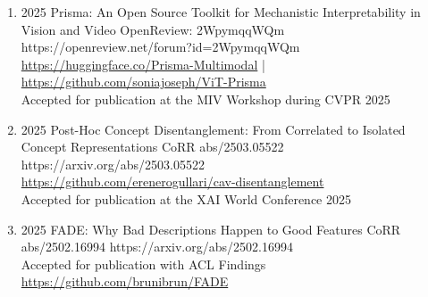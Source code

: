 {\begin{enumerate}
                        
        \item {}
                        {2025}
                        {Prisma: An Open Source Toolkit for Mechanistic Interpretability in Vision and Video}
                        {OpenReview: 2WpymqqWQm}
                        {https://openreview.net/forum?id=2WpymqqWQm}
                        {
                            \\\href{https://huggingface.co/Prisma-Multimodal}{https://huggingface.co/Prisma-Multimodal} | \href{https://github.com/soniajoseph/ViT-Prisma}{https://github.com/soniajoseph/ViT-Prisma}
                            \\ Accepted for publication at the MIV Workshop during CVPR 2025
                        }

                        
        



        \item {}
                        {2025}
                        {Post-Hoc Concept Disentanglement: From Correlated to Isolated Concept Representations}
                        {CoRR abs/2503.05522}
                        {https://arxiv.org/abs/2503.05522}
                        {
                            \\\href{https://github.com/erenerogullari/cav-disentanglement}{https://github.com/erenerogullari/cav-disentanglement}
                            \\ Accepted for publication at the XAI World Conference 2025
                        }
        
        
        \item {}
                        {2025}
                        {FADE: Why Bad Descriptions Happen to Good Features}
                        {CoRR abs/2502.16994}
                        {https://arxiv.org/abs/2502.16994}
                        {
                            \\Accepted for publication with ACL Findings
                            \\\href{https://github.com/brunibrun/FADE}{https://github.com/brunibrun/FADE}
                        }
                        

\end{enumerate}}
